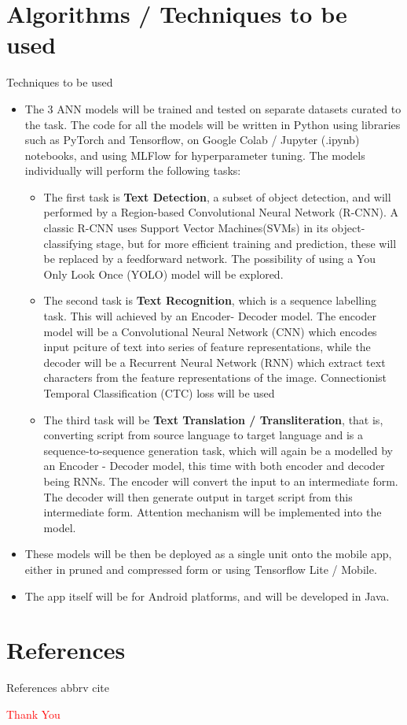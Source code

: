 \documentclass{beamer}
\begin{document}
\section{Algorithms / Techniques to be used}
	\begin{frame}[allowframebreaks]{Techniques to be used}
	\begin{itemize}
		\item The 3 ANN models will be trained and tested on separate datasets curated to the task. The code for all the models will be written in Python using libraries such as PyTorch and Tensorflow, on Google Colab / Jupyter (.ipynb) notebooks, and using MLFlow for hyperparameter tuning. The models individually will perform the following tasks:
		\begin{itemize}
			\item The first task is \textbf{Text Detection}, a subset of object detection, and will performed by a Region-based Convolutional Neural Network (R-CNN). A classic R-CNN uses Support Vector Machines(SVMs) in its object-classifying stage, but for more efficient training and prediction, these will be replaced by a feedforward network. The possibility of using a You Only Look Once (YOLO) model will be explored.
			\item The second task is \textbf{Text Recognition}, which is a sequence labelling task. This will achieved by an Encoder- Decoder model. The encoder model will be a Convolutional Neural Network (CNN) which encodes input pciture of text into series of feature representations, while the decoder will be a Recurrent Neural Network (RNN) which extract text characters from the feature representations of the image. Connectionist Temporal Classification (CTC) loss will be used
			\item The third task will be \textbf{Text Translation / Transliteration}, that is, converting script from source language to target language and is a sequence-to-sequence generation task, which will again be a modelled by an Encoder - Decoder model, this time with both encoder and decoder being RNNs. The encoder will convert the input to an intermediate form. The decoder will then generate output in target script from this intermediate form. Attention mechanism will be implemented into the model.
		\end{itemize}
		\item These models will be then be deployed as a single unit onto the mobile app, either in pruned and compressed form or using Tensorflow Lite / Mobile.
		\item The app itself will be for Android platforms, and will be developed in Java.
	\end{itemize}
\end{frame}

\section{References}
\begin{frame}[allowframebreaks]{References}
	 {abbrv}
	 {cite}
\end{frame}

\begin{frame}
	\begin{center}
	\LARGE
	\textcolor{red}{Thank You}
	\end{center}
\end{frame}
	
\end{document}
